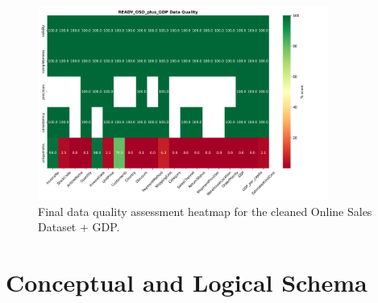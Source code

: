 \documentclass[a4paper,11pt]{article}
\begin{document}
\begin{figure}
    \centering
    \includegraphics[width=0.85\textwidth]{../Visualizations/Post/POST_OSD_plus_GDP_heatmap.png}
    \caption{Final data quality assessment heatmap for the cleaned Online Sales Dataset + GDP.}
    \label{fig:final_data_quality_heatmap}
\end{figure}

\section{Conceptual and Logical Schema}
\end{document}
